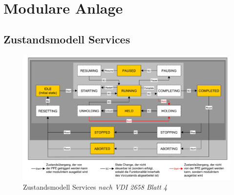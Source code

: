 \chapter{Modulare Anlage}
\section{Zustandsmodell Services}
\label{A:Zustandsmodell-Services}

 \begin{figure}[htbp]
 \centering
 \includegraphics[scale=0.34]{DA_files/Bilder/Anhang/Zustandsdiagramm-Services.pdf}
 \caption[Zustandsmodell Services \textit{nach VDI 2658 Blatt 4}]{Zustandsmodell Services \textit{nach VDI 2658 Blatt 4} \citep[]{VDI2658-Blatt4}}
 \label{pic:Zustandsmodell-Service}
 \end{figure}
 
\newpage
